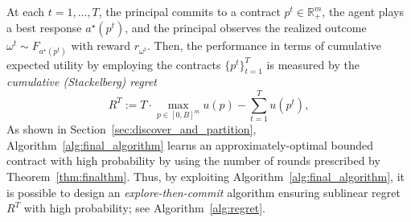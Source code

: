 At each $t = 1, \ldots, T$, the principal commits to a contract $p^t \in \mathbb{R}_+^m$, the agent plays a best response $a^\star(p^t)$, and the principal observes the realized outcome $\omega^t \sim F_{a^\star(p^t)}$ with reward $r_{\omega^t}$.
%
%
Then, the performance in terms of cumulative expected utility by employing the contracts $\{p^t\}_{t=1}^T$ is measured by the \emph{cumulative (Stackelberg) regret}
%
%
%
		$$
		R^T := T \cdot\max_{p \in [0,B]^m} u(p) - \sum_{t=1}^T    u(p^t)  ,$$
%
%
As shown in Section~\ref{sec:discover_and_partition}, Algorithm~\ref{alg:final_algorithm} learns an approximately-optimal bounded contract with high probability by using the number of rounds prescribed by Theorem~\ref{thm:finalthm}.
%
%
Thus, by exploiting Algorithm~\ref{alg:final_algorithm}, it is possible to design an \emph{explore-then-commit} algorithm ensuring sublinear regret $R^T$ with high probability; see Algorithm~\ref{alg:regret}.
%
